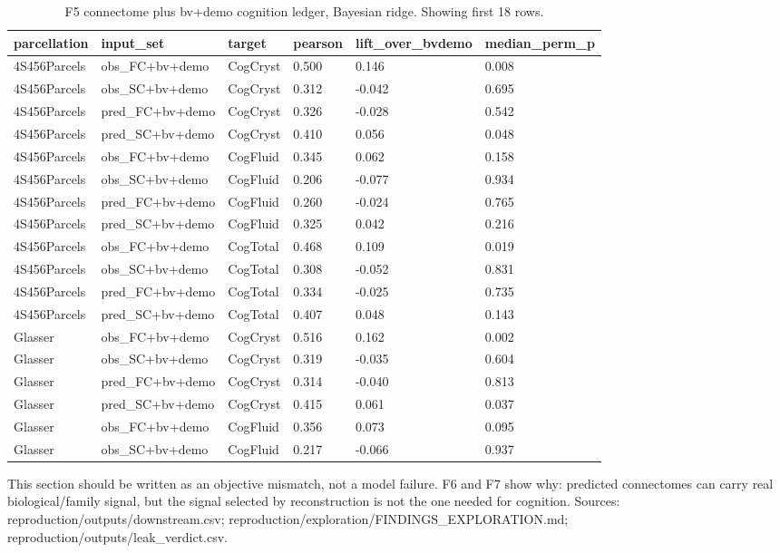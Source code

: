 \documentclass{article}
\begin{document}
\begin{table}[H]
\centering
\scriptsize
\caption{F5 connectome plus bv+demo cognition ledger, Bayesian ridge. Showing first 18 rows.}
\label{tab:f5}
\begin{tabular}{llllll}
\toprule
parcellation & input\_set & target & pearson & lift\_over\_bvdemo & median\_perm\_p \\
\midrule
4S456Parcels & obs\_FC+bv+demo & CogCryst & 0.500 & 0.146 & 0.008 \\
4S456Parcels & obs\_SC+bv+demo & CogCryst & 0.312 & -0.042 & 0.695 \\
4S456Parcels & pred\_FC+bv+demo & CogCryst & 0.326 & -0.028 & 0.542 \\
4S456Parcels & pred\_SC+bv+demo & CogCryst & 0.410 & 0.056 & 0.048 \\
4S456Parcels & obs\_FC+bv+demo & CogFluid & 0.345 & 0.062 & 0.158 \\
4S456Parcels & obs\_SC+bv+demo & CogFluid & 0.206 & -0.077 & 0.934 \\
4S456Parcels & pred\_FC+bv+demo & CogFluid & 0.260 & -0.024 & 0.765 \\
4S456Parcels & pred\_SC+bv+demo & CogFluid & 0.325 & 0.042 & 0.216 \\
4S456Parcels & obs\_FC+bv+demo & CogTotal & 0.468 & 0.109 & 0.019 \\
4S456Parcels & obs\_SC+bv+demo & CogTotal & 0.308 & -0.052 & 0.831 \\
4S456Parcels & pred\_FC+bv+demo & CogTotal & 0.334 & -0.025 & 0.735 \\
4S456Parcels & pred\_SC+bv+demo & CogTotal & 0.407 & 0.048 & 0.143 \\
Glasser & obs\_FC+bv+demo & CogCryst & 0.516 & 0.162 & 0.002 \\
Glasser & obs\_SC+bv+demo & CogCryst & 0.319 & -0.035 & 0.604 \\
Glasser & pred\_FC+bv+demo & CogCryst & 0.314 & -0.040 & 0.813 \\
Glasser & pred\_SC+bv+demo & CogCryst & 0.415 & 0.061 & 0.037 \\
Glasser & obs\_FC+bv+demo & CogFluid & 0.356 & 0.073 & 0.095 \\
Glasser & obs\_SC+bv+demo & CogFluid & 0.217 & -0.066 & 0.937 \\
\bottomrule
\end{tabular}
\end{table}

This section should be written as an objective mismatch, not a model failure. F6 and F7
show why: predicted connectomes can carry real biological/family signal, but the signal
selected by reconstruction is not the one needed for cognition.  Sources: reproduction/outputs/downstream.csv; reproduction/exploration/FINDINGS\_EXPLORATION.md; reproduction/outputs/leak\_verdict.csv.
\end{document}
